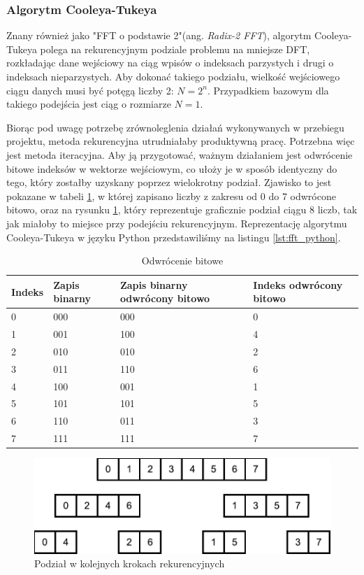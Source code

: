\documentclass[a4paper,12pt]{book} %
\begin{document}
\subsubsection{Algorytm Cooleya-Tukeya}
Znany również jako "FFT o podstawie 2"(ang. \emph{Radix-2 FFT}), algorytm Cooleya-Tukeya polega na rekurencyjnym podziale problemu na mniejsze DFT, rozkładając dane wejściowy na ciąg wpisów o indeksach parzystych i drugi o indeksach nieparzystych.\cite{CooleyTukey} Aby dokonać takiego podziału, wielkość wejściowego ciągu danych musi być potęgą liczby 2: $N = 2^n.$ Przypadkiem bazowym dla takiego podejścia jest ciąg o rozmiarze $N = 1.$

Biorąc pod uwagę potrzebę zrównoleglenia działań wykonywanych w przebiegu projektu, metoda rekurencyjna utrudniałaby produktywną pracę. Potrzebna więc jest metoda iteracyjna. Aby ją przygotować, ważnym działaniem jest odwrócenie bitowe indeksów w wektorze wejściowym, co ułoży je w sposób identyczny do tego, który zostałby uzyskany poprzez wielokrotny podział. Zjawisko to jest pokazane w tabeli \ref{tab:bit_reversal}, w której zapisano liczby z zakresu od 0 do 7 odwrócone bitowo, oraz na rysunku \ref{fig:bit_reversal}, który reprezentuje graficznie podział ciągu 8 liczb, tak jak miałoby to miejsce przy podejściu rekurencyjnym. Reprezentację algorytmu Cooleya-Tukeya w języku Python przedstawiliśmy na listingu \ref{lst:fft_python}.

\begin{table}[H]
\begin{adjustbox}{max width=\textwidth}
\begin{tabular}{|l|l|l|l|}
\hline
Indeks & Zapis binarny & Zapis binarny odwrócony bitowo & Indeks odwrócony bitowo \\
\hline
0 & 000 & 000 & 0 \\
1 & 001 & 100 & 4 \\
2 & 010 & 010 & 2 \\
3 & 011 & 110 & 6 \\
4 & 100 & 001 & 1 \\
5 & 101 & 101 & 5 \\
6 & 110 & 011 & 3 \\
7 & 111 & 111 & 7 \\
\hline
\end{tabular}
\end{adjustbox}
\caption{Odwrócenie bitowe}
\label{tab:bit_reversal}
\end{table}
\begin{figure}[h]
	\centering
	\includegraphics[scale=0.7]{assets/bit_reversal.pdf}
	\caption{Podział w kolejnych krokach rekurencyjnych}
	\label{fig:bit_reversal}
\end{figure}
\end{document}
